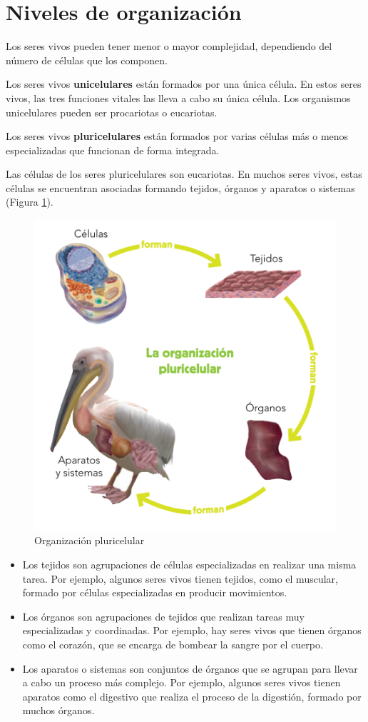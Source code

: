 \section{Niveles de organización}

Los seres vivos pueden tener menor o mayor complejidad, dependiendo del número de células que los componen.

\vspace{3mm}
Los seres vivos \textbf{unicelulares} están formados por una única célula. En estos seres vivos, las tres funciones vitales las lleva a cabo su única célula. Los organismos unicelulares pueden ser procariotas o eucariotas.

\vspace{3mm}
Los seres vivos \textbf{pluricelulares} están formados por varias células más o menos especializadas que funcionan de forma integrada.

\vspace{3mm}
Las células de los seres pluricelulares son eucariotas. En muchos seres vivos, estas células se encuentran asociadas formando tejidos, órganos y aparatos o sistemas (Figura \ref{fig:organizacion-pluricelular}).

\begin{figure}[!ht]
    \centering
    \includegraphics[width=0.5\linewidth]{Tema1/08_Organizacion_pluricelular.png}
    \caption{Organización pluricelular}
    \label{fig:organizacion-pluricelular}
\end{figure}

\begin{itemize}
    \item Los tejidos son agrupaciones de células especializadas en realizar una misma tarea. Por ejemplo, algunos seres vivos tienen tejidos, como el muscular, formado por células especializadas en producir movimientos.
    \item Los órganos son agrupaciones de tejidos que realizan tareas muy especializadas y coordinadas. Por ejemplo, hay seres vivos que tienen órganos como el corazón, que se encarga de bombear la sangre por el cuerpo.
    \item Los aparatos o sistemas son conjuntos de órganos que se agrupan para llevar a cabo un proceso más complejo. Por ejemplo, algunos seres vivos tienen aparatos como el digestivo que realiza el proceso de la digestión, formado por muchos órganos.
\end{itemize}